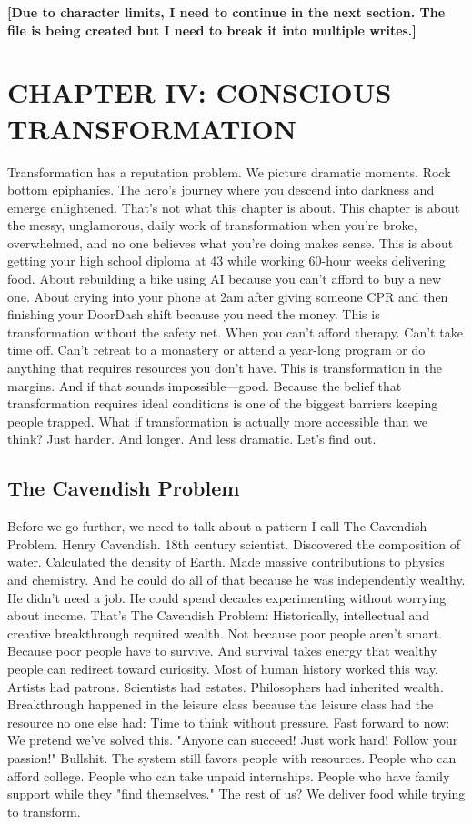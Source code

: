 \documentclass[12pt,openany]{book}
\begin{document}
\textbf{[Due to character limits, I need to continue in the next section. The file is being created but I need to break it into multiple writes.]}

\chapter{CHAPTER IV: CONSCIOUS TRANSFORMATION}

Transformation has a reputation problem.
We picture dramatic moments. Rock bottom epiphanies. The hero's journey where you descend into darkness and emerge enlightened.
That's not what this chapter is about.
This chapter is about the messy, unglamorous, daily work of transformation when you're broke, overwhelmed, and no one believes what you're doing makes sense.
This is about getting your high school diploma at 43 while working 60-hour weeks delivering food. About rebuilding a bike using AI because you can't afford to buy a new one. About crying into your phone at 2am after giving someone CPR and then finishing your DoorDash shift because you need the money.
This is transformation without the safety net.
When you can't afford therapy. Can't take time off. Can't retreat to a monastery or attend a year-long program or do anything that requires resources you don't have.
This is transformation in the margins.
And if that sounds impossible—good. Because the belief that transformation requires ideal conditions is one of the biggest barriers keeping people trapped.
What if transformation is actually more accessible than we think? Just harder. And longer. And less dramatic.
Let's find out.

\section{The Cavendish Problem}

Before we go further, we need to talk about a pattern I call The Cavendish Problem.
Henry Cavendish. 18th century scientist. Discovered the composition of water. Calculated the density of Earth. Made massive contributions to physics and chemistry.
And he could do all of that because he was independently wealthy. He didn't need a job. He could spend decades experimenting without worrying about income.
That's The Cavendish Problem: Historically, intellectual and creative breakthrough required wealth.
Not because poor people aren't smart. Because poor people have to survive. And survival takes energy that wealthy people can redirect toward curiosity.
Most of human history worked this way.
Artists had patrons. Scientists had estates. Philosophers had inherited wealth. Breakthrough happened in the leisure class because the leisure class had the resource no one else had: Time to think without pressure.
Fast forward to now:
We pretend we've solved this. "Anyone can succeed! Just work hard! Follow your passion!"
Bullshit.
The system still favors people with resources. People who can afford college. People who can take unpaid internships. People who have family support while they "find themselves."
The rest of us? We deliver food while trying to transform.
\end{document}
